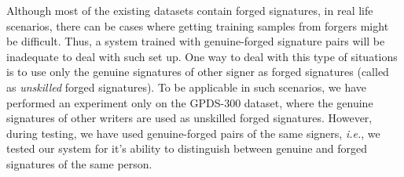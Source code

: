 \documentclass[times,twocolumn,final]{elsarticle}
\newcommand{\ie}{\textit{i.e.}}
\begin{document}
Although most of the existing datasets contain forged signatures, in real life scenarios, there can be cases where getting training samples from forgers might be difficult. Thus, a system trained with genuine-forged signature pairs will be inadequate to deal with such set up. One way to deal with this type of situations is to use only the genuine signatures of other signer as forged signatures (called as \emph{unskilled} forged signatures). To be applicable in such scenarios, we have performed an experiment only on the GPDS-300 dataset, where the genuine signatures of other writers are used as unskilled forged signatures. However, during testing, we have used genuine-forged pairs of the same signers, \ie, we tested our system for it's ability to distinguish between genuine and forged signatures of the same person. 
\end{document}
